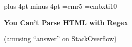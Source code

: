 \parskip 10pt plus 4pt minus 4pt\parindent=0pt%
\lineskiplimit=-1000pt%
\font\lil=cmr5%
\font\bfit=cmbxti10%
\def\rayz#1#2{\llap{\raise #1\hbox{#2}}}%
\def\rayzl#1#2{\llap{\raise #1\hbox{\lil #2}}}%
\def\strike#1{\rlap{\raise 0.7ex\hbox{\vrule height 0.5pt width #1}}}%
\def\graybox#1{\rlap{\special{color push rgb 0.8 0.8 0.8}%
\lower 2pt\hbox{\vrule height 2ex width #1}\special{color pop}}}
\centerline{\bf You Can't Parse HTML with Regex}
\centerline{(amusing ``answer'' on StackOverflow)}

\bigskip

